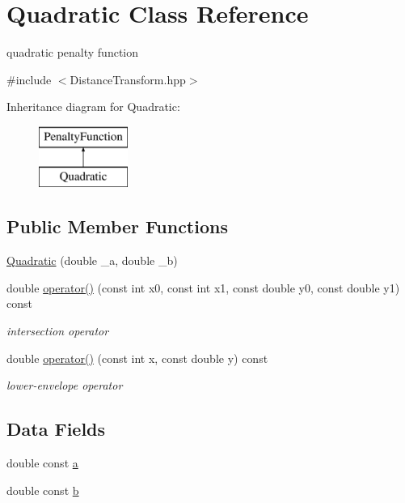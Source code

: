 \hypertarget{class_quadratic}{\section{Quadratic Class Reference}
\label{class_quadratic}
}


quadratic penalty function  




{\ttfamily \#include $<$Distance\-Transform.\-hpp$>$}

Inheritance diagram for Quadratic\-:\begin{figure}[H]
\begin{center}
\leavevmode
\includegraphics[height=2.000000cm]{class_quadratic}
\end{center}
\end{figure}
\subsection*{Public Member Functions}
\begin{DoxyCompactItemize}
\item 
\hyperlink{class_quadratic_aa5d5e8e58a9d0aaf332e6b8b879430b8}{Quadratic} (double \-\_\-a, double \-\_\-b)
\item 
double \hyperlink{class_quadratic_ad074fa92b51e0590f6621b60ac01219a}{operator()} (const int x0, const int x1, const double y0, const double y1) const 
\begin{DoxyCompactList}\small\item\em intersection operator \end{DoxyCompactList}\item 
double \hyperlink{class_quadratic_ae1f3f6d71209aafe6bb1636a8c17489c}{operator()} (const int x, const double y) const 
\begin{DoxyCompactList}\small\item\em lower-\/envelope operator \end{DoxyCompactList}\end{DoxyCompactItemize}
\subsection*{Data Fields}
\begin{DoxyCompactItemize}
\item 
double const \hyperlink{class_quadratic_a3784ebac36b04b9195d44d6d5bc8933a}{a}
\item 
double const \hyperlink{class_quadratic_a1df1154ac27afe4533b5b695831ed23a}{b}
\end{DoxyCompactItemize}
